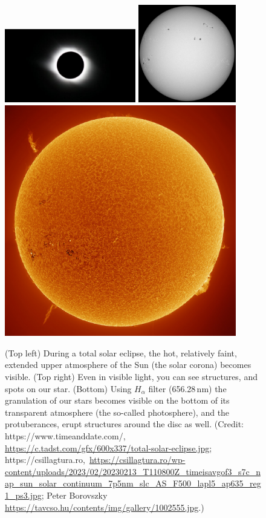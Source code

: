 \documentclass[sn-aps]{sn-jnl}%
\begin{document}
\begin{figure}[h]
\centering
\includegraphics[width=0.51\textwidth]{facsko_iccecip2022-f01a.eps}
\includegraphics[width=0.38\textwidth]{facsko_iccecip2022-f01b.eps}
\includegraphics[width=0.9\textwidth]{facsko_iccecip2022-f01c.eps}
\caption{(Top left) During a total solar eclipse, the hot, relatively faint, extended upper atmosphere of the Sun (the solar corona) becomes visible. (Top right) Even in visible light, you can see structures, and spots on our star. (Bottom) Using $H_{\alpha}$ filter (656.28\,nm) the granulation of our stars becomes visible on the bottom of its transparent atmosphere (the so-called photosphere), and the protuberances, erupt structures around the disc as well. (Credit: https://www.timeanddate.com/, \url{https://c.tadst.com/gfx/600x337/total-solar-eclipse.jpg}; https://csillagtura.ro,~\url{https://csillagtura.ro/wp-content/uploads/2023/02/20230213_T110800Z_timeisavgof3_s7c_nap_sun_solar_continuum_7p5nm_slc_AS_F500_lapl5_ap635_reg1_ps3.jpg}; Peter Borovszky \url{https://tavcso.hu/contents/img/gallery/1002555.jpg}.)}\label{fig:sunvisible}
\end{figure}
\end{document}
